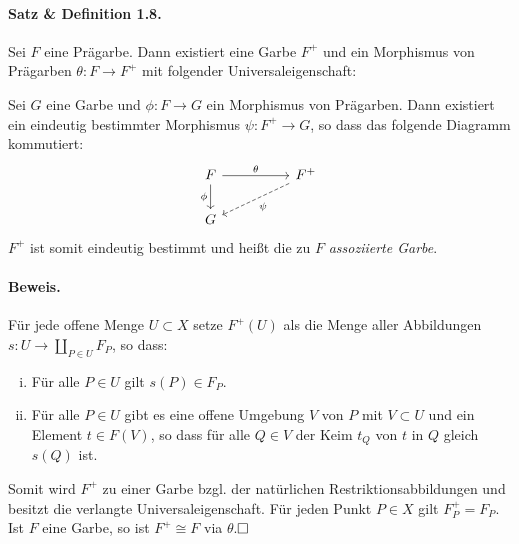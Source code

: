 \documentclass[11pt,b5paper,openany]{memoir}
\def \qed {$\hfill\square$}
\begin{document}
\paragraph{Satz \& Definition 1.8.}\label{1.8} Sei $F$ eine Prägarbe. Dann existiert eine Garbe $F^+$ und ein Morphismus von Prägarben $\theta:F\to F^+$ mit folgender Universaleigenschaft:

Sei $G$ eine Garbe und $\phi:F\to G$ ein Morphismus von Prägarben. Dann existiert ein eindeutig bestimmter Morphismus $\psi:F^+\to G$, so dass das folgende Diagramm kommutiert:
\[\begin{tikzcd} 
F\ar[rr, "\theta"]\ar[d, "\phi"'] && F^+\ar[dll, "\psi", dashed]\\
G
\end{tikzcd} \]
$F^+$ ist somit eindeutig bestimmt und heißt die zu $F$ \textit{assoziierte Garbe}.

\paragraph{Beweis.} Für jede offene Menge $U\subset X$ setze $F^+(U)$ als die Menge aller Abbildungen $s:U\to\coprod_{P\in U}F_P$, so dass:
\begin{enumerate}[(i)]
\item Für alle $P\in U$ gilt $s(P)\in F_P$.
\item Für alle $P\in U$ gibt es eine offene Umgebung $V$ von $P$ mit $V\subset U$ und ein Element $t\in F(V)$, so dass für alle $Q\in V$ der Keim $t_Q$ von $t$ in $Q$ gleich $s(Q)$ ist.
\end{enumerate}
Somit wird $F^+$ zu einer Garbe bzgl. der natürlichen Restriktionsabbildungen und besitzt die verlangte Universaleigenschaft. Für jeden Punkt $P\in X$ gilt $F^+_P=F_P$. Ist $F$ eine Garbe, so ist $F^+\cong F$ via $\theta$.\qed 
\end{document}
